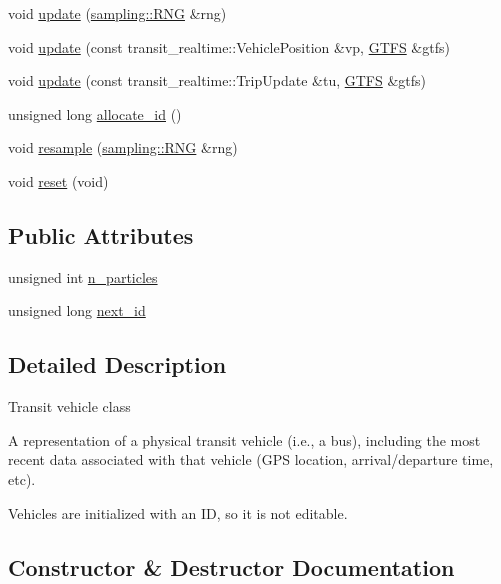 \begin{DoxyCompactItemize}
void \hyperlink{classgtfs_1_1Vehicle_a4baee648ab1db5b69aa2ffef7203c2bf}{update} (\hyperlink{classsampling_1_1RNG}{sampling\+::\+R\+NG} \&rng)
\item 
void \hyperlink{classgtfs_1_1Vehicle_add9266d843398c88d3fcc22239f586a9}{update} (const transit\+\_\+realtime\+::\+Vehicle\+Position \&vp, \hyperlink{classgtfs_1_1GTFS}{G\+T\+FS} \&gtfs)
\item 
void \hyperlink{classgtfs_1_1Vehicle_ae9944f06fb0bde02f2d7c21f2dc33787}{update} (const transit\+\_\+realtime\+::\+Trip\+Update \&tu, \hyperlink{classgtfs_1_1GTFS}{G\+T\+FS} \&gtfs)
\item 
unsigned long \hyperlink{classgtfs_1_1Vehicle_aa9087e973a9821f384ec47f51bdcedc7}{allocate\+\_\+id} ()
\item 
void \hyperlink{classgtfs_1_1Vehicle_a8367fc70a64b7e596422f880dbff1193}{resample} (\hyperlink{classsampling_1_1RNG}{sampling\+::\+R\+NG} \&rng)
\item 
void \hyperlink{classgtfs_1_1Vehicle_a63474849e632ce31730b120debe50792}{reset} (void)
\end{DoxyCompactItemize}
\subsection*{Public Attributes}
\begin{DoxyCompactItemize}
\item 
unsigned int \hyperlink{classgtfs_1_1Vehicle_aa21babc8423abf92bbdf5e0748444f44}{n\+\_\+particles}
\item 
unsigned long \hyperlink{classgtfs_1_1Vehicle_aab535dd9953f9650e2adc351965779b1}{next\+\_\+id}
\end{DoxyCompactItemize}


\subsection{Detailed Description}
Transit vehicle class

A representation of a physical transit vehicle (i.\+e., a bus), including the most recent data associated with that vehicle (G\+PS location, arrival/departure time, etc).

Vehicles are initialized with an ID, so it is not editable. 

\subsection{Constructor \& Destructor Documentation}
